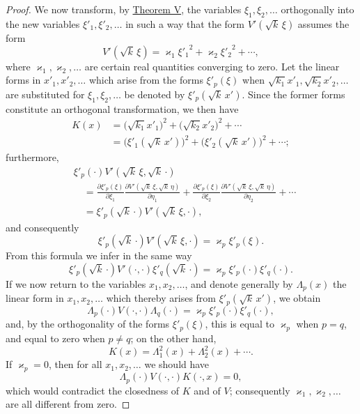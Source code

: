 \documentclass[b5paper,twoside]{article}
\newcommand{\originalpage}[1]{\phantomsection\label{origpage:#1}}
\begin{document}
\begin{proof}
We now transform, by \hyperref[thm:V]{Theorem V}, the variables
$\xi_1,\xi_2,\ldots$ orthogonally into the new variables
$\xi'_1,\xi'_2,\ldots$ in such a way that the form
$V'(\sqrt{k}\,\xi)$ assumes the form
\[
  V'(\sqrt{k}\,\xi)
  =\varkappa_1{\xi'_1}^{2}+\varkappa_2{\xi'_2}^{2}+\cdots,
\]
where $\varkappa_1,\varkappa_2,\ldots$ are certain real quantities
converging to zero. Let the linear forms in $x'_1,x'_2,\ldots$ which arise
from the forms $\xi'_p(\xi)$ when
$\sqrt{k_1}x'_1,\sqrt{k_2}x'_2,\ldots$ are substituted for
$\xi_1,\xi_2,\ldots$ be denoted by $\xi'_p(\sqrt{k}\,x')$. Since the former
forms constitute an orthogonal transformation, we then have
\begin{align*}
  K(x)
  &=\bigl(\sqrt{k_1}x'_1\bigr)^2
    +\bigl(\sqrt{k_2}x'_2\bigr)^2+\cdots\\
  &=\bigl(\xi'_1(\sqrt{k}\,x')\bigr)^2
    +\bigl(\xi'_2(\sqrt{k}\,x')\bigr)^2+\cdots;
\end{align*}
furthermore,
\begin{align*}
 &\xi'_p(\mathord{\cdot})
 V'(\sqrt{k}\,\xi,\sqrt{k}\,\mathord{\cdot}) \\
 &\quad=\frac{\partial\xi'_p(\xi)}{\partial\xi_1}
 \frac{\partial V'(\sqrt{k}\,\xi,\sqrt{k}\,\eta)}{\partial\eta_1}
 +\frac{\partial\xi'_p(\xi)}{\partial\xi_2}
 \frac{\partial V'(\sqrt{k}\,\xi,\sqrt{k}\,\eta)}{\partial\eta_2}
 +\cdots\\
 &\quad=\xi'_p(\sqrt{k}\,\mathord{\cdot})
 V'(\sqrt{k}\,\xi,\mathord{\cdot}),
\end{align*}
and consequently
\[
  \xi'_p(\sqrt{k}\,\mathord{\cdot})
  V'(\sqrt{k}\,\xi,\mathord{\cdot})
  =\varkappa_p\xi'_p(\xi).
\]
From this formula we infer in the same way
\[
  \xi'_p(\sqrt{k}\,\mathord{\cdot})V'(\mathord{\cdot},\mathord{\cdot})
  \xi'_q(\sqrt{k}\,\mathord{\cdot})
  =\varkappa_p\xi'_p(\mathord{\cdot})\xi'_q(\mathord{\cdot}).
\]
If we now return to the variables $x_1,x_2,\ldots$, and denote generally by
$\Lambda_p(x)$ the linear form in $x_1,x_2,\ldots$ which thereby arises from
$\xi'_p(\sqrt{k}\,x')$, we obtain
\[
  \Lambda_p(\mathord{\cdot})V(\mathord{\cdot},\mathord{\cdot})
  \Lambda_q(\mathord{\cdot})
  =\varkappa_p\xi'_p(\mathord{\cdot})\xi'_q(\mathord{\cdot}),
\]
and, by the orthogonality of the forms $\xi'_p(\xi)$, this is equal to
$\varkappa_p$ when $p=q$, and equal to zero when $p\ne q$; on the other hand,
\[
  K(x)=\Lambda_1^2(x)+\Lambda_2^2(x)+\cdots.
\]
If $\varkappa_p=0$, then for all $x_1,x_2,\ldots$ we should have
\[
  \Lambda_p(\mathord{\cdot})V(\mathord{\cdot},\mathord{\cdot})
  K(\mathord{\cdot},x)=0,
\]
which would contradict the closedness of $K$ and of $V$;
\originalpage{212}
consequently $\varkappa_1,\varkappa_2,\ldots$ are all different from zero.


\end{proof}
\end{document}
